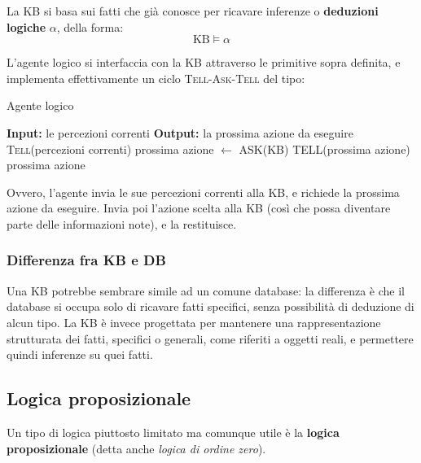 \documentclass[a4paper,11pt]{article}
\begin{document}
La KB si basa sui fatti che già conosce per ricavare inferenze o \textbf{deduzioni logiche} $\alpha$, della forma:
$$ \text{KB} \models \alpha $$

L'agente logico si interfaccia con la KB attraverso le primitive sopra definita, e implementa effettivamente un ciclo \textsc{Tell}-\textsc{Ask}-\textsc{Tell} del tipo:

\begin{algorithm}
\caption{Agente logico}
\begin{algorithmic}
	\STATE \textbf{Input:} le percezioni correnti %
	\STATE \textbf{Output:} la prossima azione da eseguire %
	\STATE \textsc{Tell}(percezioni correnti)
	\STATE prossima azione $\leftarrow$ \textsc{ASK}(KB)
	\STATE \textsc{TELL}(prossima azione)
	\RETURN prossima azione
\end{algorithmic}
\end{algorithm}

Ovvero, l'agente invia le sue percezioni correnti alla KB, e richiede la prossima azione da eseguire.
Invia poi l'azione scelta alla KB (così che possa diventare parte delle informazioni note), e la restituisce.

\subsubsection{Differenza fra KB e DB}
Una KB potrebbe sembrare simile ad un comune database: la differenza è che il database si occupa solo di ricavare fatti specifici, senza possibilità di deduzione di alcun tipo.
La KB è invece progettata per mantenere una rappresentazione strutturata dei fatti, specifici o generali, come riferiti a oggetti reali, e permettere quindi inferenze su quei fatti. 

\subsection{Logica proposizionale}
Un tipo di logica piuttosto limitato ma comunque utile è la \textbf{logica proposizionale} (detta anche \textit{logica di ordine zero}).
\end{document}
